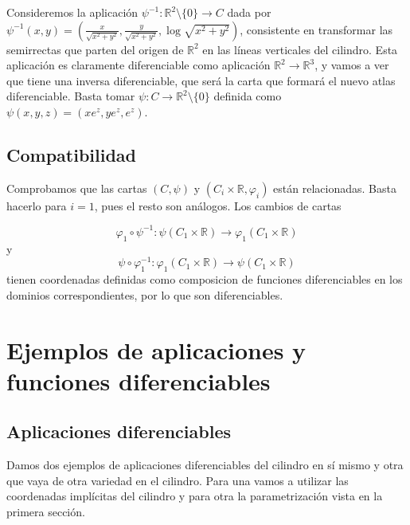 \documentclass[twoside, 11pt]{article}
\theoremstyle{definition}
\newcommand{\R}{\mathbb{R}}
\begin{document}
Consideremos la aplicación $\psi^{-1}:\R^2 \setminus\{0\}\to C$ dada por $\psi^{-1}(x,y)=\left(\frac{x}{\sqrt{x^2+y^2}},\frac{y}{\sqrt{x^2+y^2}}, \log\sqrt{x^2+y^2} \right)$, consistente en transformar las semirrectas que parten del origen de $\R^2$ en las líneas verticales del cilindro. Esta aplicación es claramente diferenciable como aplicación $\R^2\to\R^3$, y vamos a ver que tiene una inversa diferenciable, que será la carta que formará el nuevo atlas diferenciable. Basta tomar $\psi:C\to\R^2\setminus\{0\}$ definida como $\psi(x,y,z)=(xe^z,ye^z,e^z)$. 

\subsection{Compatibilidad}

Comprobamos que las cartas $(C, \psi)$ y $(C_i\times\R, \varphi_i)$ están relacionadas. Basta hacerlo para $i=1$, pues el resto son análogos. Los cambios de cartas

\[
\varphi_1\circ \psi^{-1}: \psi(C_1\times\R)\to \varphi_1(C_1\times\R)
\]
y 
\[
\psi\circ\varphi_1^{-1} : \varphi_1(C_1\times\R)\to \psi(C_1\times\R)
\]
tienen coordenadas definidas como composicion de funciones diferenciables en los dominios correspondientes, por lo que son diferenciables. 

\section{Ejemplos de aplicaciones y funciones diferenciables}

\subsection{Aplicaciones diferenciables}
Damos dos ejemplos de aplicaciones diferenciables del cilindro en sí mismo y otra que vaya de otra variedad en el cilindro. Para una vamos a utilizar las coordenadas implícitas del cilindro y para otra la parametrización vista en la primera sección. 
\end{document}
